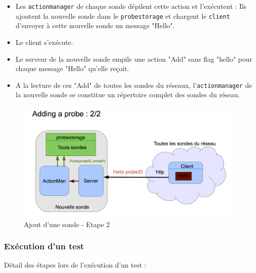 \documentclass[a4paper,11pt]{article}
\begin{document}
\begin{itemize}
\item Les \texttt{actionmanager} de chaque sonde dépilent cette action et l'exécutent : Ils ajoutent la nouvelle sonde dans le \texttt{probestorage} et chargent le \texttt{client} d'envoyer à cette nouvelle sonde un message "Hello".
\item Le client s'exécute.
\item Le serveur de la nouvelle sonde empile une action "Add" sans flag "hello" pour chaque message "Hello" qu'elle reçoit.
\item A la lecture de ces "Add" de toutes les sondes du réseaux, l'\texttt{actionmanager} de la nouvelle sonde se constitue un répertoire complet des sondes du réseau.
\end{itemize}

\begin{figure}[!ht]
\centering\includegraphics[width=0.6\linewidth]{img/graphAdd2.png}
\caption{Ajout d'une sonde - Etape 2}
\end{figure}

\FloatBarrier



\subsubsection{Exécution d'un test}

Détail des étapes lors de l'exécution d'un test :
\end{document}
